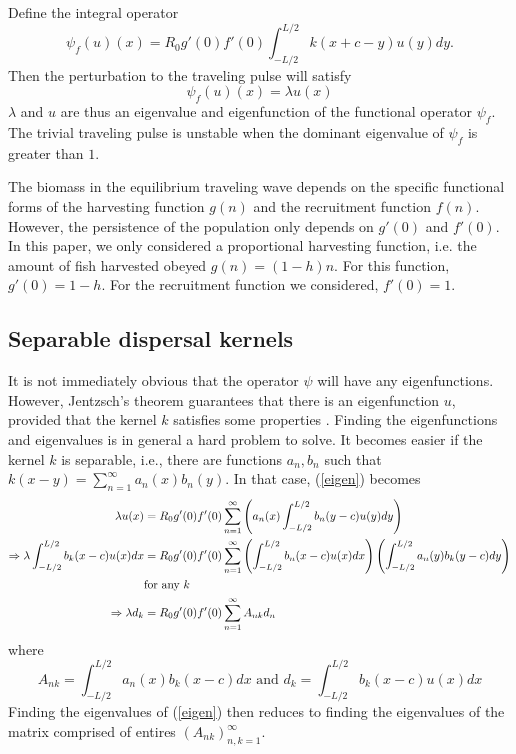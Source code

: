 \documentclass[12pt,english]{article}
\begin{document}
Define the integral operator
$$ \psi_f(u)(x)=R_0g'(0)f'(0)\int_{-L/2}^{L/2}k(x+c-y)u(y)dy. $$
Then the perturbation to the traveling pulse will satisfy 
\begin{equation} \psi_f(u)(x)=\lambda u(x) \label{eigen} \end{equation}
$\lambda$ and $u$ are thus an eigenvalue and eigenfunction of the functional operator $\psi_f$.  The trivial traveling pulse is unstable when the dominant eigenvalue of $\psi_f$ is greater than $1$.


The biomass in the equilibrium traveling wave depends on the specific functional forms of the harvesting function $g(n)$ and the recruitment function $f(n)$.  However, the persistence of the population only depends on $g'(0)$ and $f'(0)$. In this paper, we only considered a proportional harvesting function, i.e. the amount of fish harvested obeyed $g(n)=(1-h)n$.  For this function, $g'(0)=1-h$.  For the recruitment function we considered, $f'(0)=1$.

\subsection{Separable dispersal kernels \label{sep}}
It is not immediately obvious that the operator $\psi$ will have any eigenfunctions.  However, Jentzsch's theorem guarantees that there is an eigenfunction $u$, provided that the kernel $k$ satisfies some properties \citep{ZhouKot2011}.  Finding the eigenfunctions and eigenvalues is in general a hard problem to solve.  It becomes easier if the kernel $k$ is separable, i.e., there are functions $a_n,b_n$ such that $k(x-y)=\sum_{n=1}^\infty a_n(x)b_n(y)$.  In that case, (\ref{eigen}) becomes
\begin{align}
\lambda u(x)&=R_0g'(0)f'(0)\sum_{n=1}^\infty\left( a_n(x)\int_{-L/2}^{L/2}b_n(y-c)u(y)dy\right) \notag
\\ \Rightarrow \lambda\int_{-L/2}^{L/2}b_k(x-c)u(x)dx&=R_0g'(0)f'(0)\sum_{n=1}^{\infty}\left(\int_{-L/2}^{L/2}b_n(x-c)u(x)dx\right)\left(\int_{-L/2}^{L/2}a_n(y)b_k(y-c)dy\right) \notag
\\& \text{for any $k$} \notag
\\ \Rightarrow \lambda d_k&=R_0g'(0)f'(0)\sum_{n=1}^\infty A_{nk}d_n  \label{problem}
\end{align}
where
\begin{equation*}
A_{nk}=\int_{-L/2}^{L/2}a_n(x)b_k(x-c)dx \text{ and } d_k=\int_{-L/2}^{L/2}b_k(x-c)u(x)dx
\end{equation*}
Finding the eigenvalues of (\ref{eigen}) then reduces to finding the eigenvalues of the matrix comprised of entires $(A_{nk})_{n,k=1}^\infty$.
\end{document}
